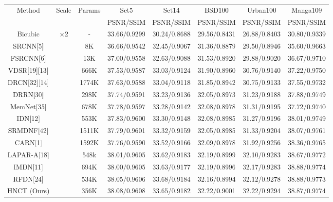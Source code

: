 \documentclass[10pt,twocolumn,letterpaper]{article}
\begin{document}
\begin{table}[htbp]
    \resizebox{\columnwidth}{!}
    {
        \begin{tabular}{|c|c|c|c|c|c|c|c|}
        \hline
        \multirow{2}{*}{Method} & \multirow{2}{*}{Scale} & \multirow{2}{*}{Params} & Set5  & Set14 & BSD100 & Urban100 & Manga109 \bigstrut\\
    \cline{4-8}          &       &       & PSNR/SSIM & PSNR/SSIM & PSNR/SSIM & PSNR/SSIM & PSNR/SSIM \bigstrut\\
        \hline
        Bicubic & \multirow{14}[2]{*}{×2} & -     & 33.66/0.9299 & 30.24/0.8688 & 29.56/0.8431 & 26.88/0.8403 & 30.80/0.9339 \bigstrut[t]\\
        SRCNN[5] &       & 8K    & 36.66/0.9542 & 32.45/0.9067 & 31.36/0.8879 & 29.50/0.8946 & 35.60/0.9663 \\
        FSRCNN[6] &       & 13K   & 37.00/0.9558 & 32.63/0.9088 & 31.53/0.8920 & 29.88/0.9020 & 36.67/0.9710 \\
        VDSR[19][13] &       & 666K  & 37.53/0.9587 & 33.03/0.9124 & 31.90/0.8960 & 30.76/0.9140 & 37.22/0.9750 \\
        DRCN[32][14] &       & 1774K & 37.63/0.9588 & 33.04/0.9118 & 31.85/0.8942 & 30.75/0.9133 & 37.55/0.9732 \\
        DRRN[30] &       & 298K  & 37.74/0.9591 & 33.23/0.9136 & 32.05/0.8973 & 31.23/0.9188 & 37.88/0.9749 \\
        MemNet[35] &       & 678K  & 37.78/0.9597 & 33.28/0.9142 & 32.08/0.8978 & 31.31/0.9195 & 37.72/0.9740 \\
        IDN[12] &       & 553K  & 37.83/0.9600 & 33.30/0.9148 & 32.08/0.8985 & 31.27/0.9196 & 38.01/0.9749 \\
        SRMDNF[42] &       & 1511K & 37.79/0.9601 & 33.32/0.9159 & 32.05/0.8985 & 31.33/0.9204 & 38.07/0.9761 \\
        CARN[1] &       & 1592K & 37.76/0.9590 & 33.52/0.9166 & 32.09/0.8978 & 31.92/0.9256 & 38.36/0.9765 \\
        LAPAR-A[18] &       & 548k  & 38.01/0.9605 & 33.62/0.9183 & 32.19/0.8999 & 32.10/0.9283 & 38.67/0.9772 \\
        IMDN[11] &       & 694K  & 38.00/0.9605 & 33.63/0.9177 & 32.19/0.8996 & 32.17/0.9283 & 38.88/0.9774 \\
        RFDN[24] &       & 534K  & 38.05/0.9606 & 33.68/0.9184 & 32.16/0.8994 & 32.12/0.9278 & 38.88/0.9773 \\
        HNCT (Ours) &       & 356K  & 38.08/0.9608 & 33.65/0.9182 & 32.22/0.9001 & 32.22/0.9294 & 38.87/0.9774 \bigstrut[b]\\
        \hline
        \end{tabular}%
    }
\end{table}%
\end{document}
